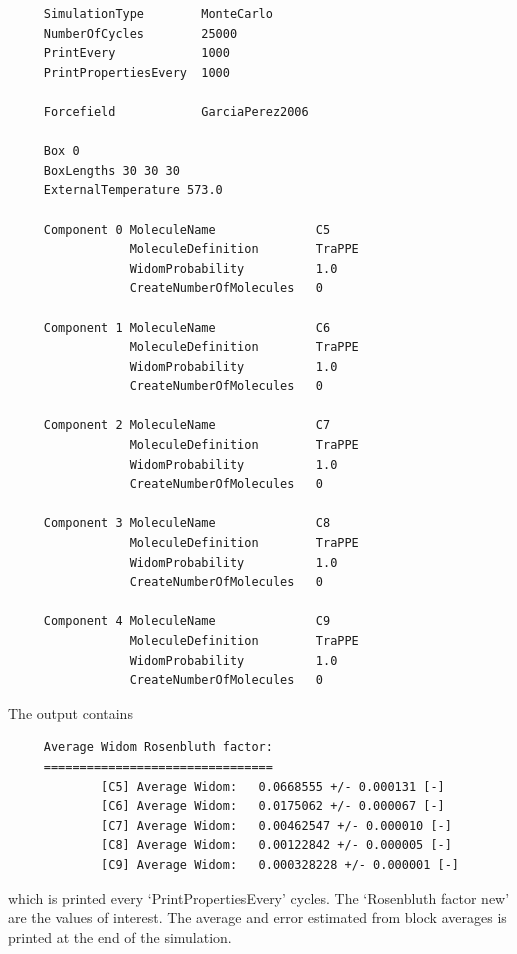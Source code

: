 \begin{tiny}
\begin{verbatim}
     SimulationType        MonteCarlo
     NumberOfCycles        25000
     PrintEvery            1000
     PrintPropertiesEvery  1000
     
     Forcefield            GarciaPerez2006
     
     Box 0
     BoxLengths 30 30 30
     ExternalTemperature 573.0
     
     Component 0 MoleculeName              C5
                 MoleculeDefinition        TraPPE
                 WidomProbability          1.0
                 CreateNumberOfMolecules   0
     
     Component 1 MoleculeName              C6
                 MoleculeDefinition        TraPPE
                 WidomProbability          1.0
                 CreateNumberOfMolecules   0
     
     Component 2 MoleculeName              C7
                 MoleculeDefinition        TraPPE
                 WidomProbability          1.0
                 CreateNumberOfMolecules   0
     
     Component 3 MoleculeName              C8
                 MoleculeDefinition        TraPPE
                 WidomProbability          1.0
                 CreateNumberOfMolecules   0
     
     Component 4 MoleculeName              C9
                 MoleculeDefinition        TraPPE
                 WidomProbability          1.0
                 CreateNumberOfMolecules   0
\end{verbatim}
\end{tiny}
\noindent
The output contains 
\begin{tiny}
\begin{verbatim}
     Average Widom Rosenbluth factor:
     ================================
             [C5] Average Widom:   0.0668555 +/- 0.000131 [-]
             [C6] Average Widom:   0.0175062 +/- 0.000067 [-]
             [C7] Average Widom:   0.00462547 +/- 0.000010 [-]
             [C8] Average Widom:   0.00122842 +/- 0.000005 [-]
             [C9] Average Widom:   0.000328228 +/- 0.000001 [-]
\end{verbatim}
\end{tiny}
which is printed every `PrintPropertiesEvery' cycles. The `Rosenbluth factor new' are the values of interest.
The average and error estimated from block averages is printed at the end
of the simulation.


